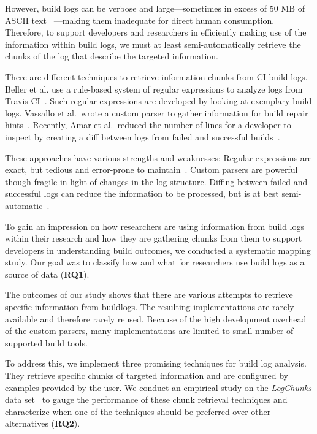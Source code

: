However, build logs can be verbose and large---sometimes in excess of
50 MB of ASCII text ~\cite{beller2017oops}---making them inadequate
for direct human consumption.
Therefore, to support developers and
researchers in efficiently making use of the information within build
logs, we must at least semi-automatically retrieve the chunks of the
log that describe the targeted information.

There are different techniques to retrieve information chunks from CI
build logs.
Beller et al.
use a rule-based system of regular
expressions to analyze logs from Travis CI~\cite{beller2017oops}.
Such regular expressions are developed by looking at exemplary build
logs.
Vassallo et al.\ wrote a custom parser to gather information
for build repair hints~\cite{vassallo2018un-break}.
Recently, Amar et
al.\ reduced the number of lines for a developer to inspect by
creating a diff between logs from failed and successful
builds~\cite{amar2019mining}.

These approaches have various strengths and weaknesses: Regular
expressions are exact, but tedious and error-prone to
maintain~\cite{michael2019regexes}.
Custom parsers are powerful
though fragile in light of changes in the log structure.
Diffing
between failed and successful logs can reduce the information to be
processed, but is at best semi-automatic~\cite{amar2019mining}.

To gain an impression on how researchers are using information from
build logs
within their research and how they are gathering chunks from them
to support
developers in understanding build outcomes, we conducted a systematic
mapping
study.
Our goal was to classify how and what for researchers use build logs as
a source
of data (\textbf{RQ1}).

The outcomes of our study shows that there are various attempts to
retrieve
specific information from buildlogs.
The resulting implementations are rarely
available and therefore rarely reused.
Because of the high development overhead
of the custom parsers, many implementations are limited to small number
of supported
build tools.

To address this, we implement three promising techniques for build
log analysis.
They retrieve specific chunks of targeted information and are configured
by
examples provided by the user.
We conduct an empirical study on the \emph{LogChunks} data
set~\cite{brandt2020logchunks} to
gauge the performance of these chunk retrieval techniques and characterize
when one of the techniques should be preferred over other alternatives
(\textbf{RQ2}).

